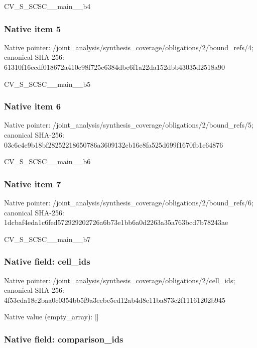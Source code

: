 \documentclass[10pt,a4paper]{article}
\begin{document}
CV\_S\_SCSC\_\_main\_\_b4


\subsubsection{Native item 5}


Native pointer: /joint\_analysis/synthesi\allowbreak{}s\_coverage/obligations/2\allowbreak{}/bound\_refs/4; canonical SHA-256: 61310f16ecdf018672a410e9\allowbreak{}8f725c6384dbe6f1a22da152\allowbreak{}dbb43035d2518a90


CV\_S\_SCSC\_\_main\_\_b5


\subsubsection{Native item 6}


Native pointer: /joint\_analysis/synthesi\allowbreak{}s\_coverage/obligations/2\allowbreak{}/bound\_refs/5; canonical SHA-256: 03c6c4e9b18bf28252218650\allowbreak{}786a3609132cb16e8fa525d6\allowbreak{}99f1670fb1e64876


CV\_S\_SCSC\_\_main\_\_b6


\subsubsection{Native item 7}


Native pointer: /joint\_analysis/synthesi\allowbreak{}s\_coverage/obligations/2\allowbreak{}/bound\_refs/6; canonical SHA-256: 1dcbaf4eda1c6fed57292920\allowbreak{}2726a6b73e1bb6a0d2263a35\allowbreak{}a763bcd7b78243ae


CV\_S\_SCSC\_\_main\_\_b7


\subsubsection{Native field: cell\_ids}


Native pointer: /joint\_analysis/synthesi\allowbreak{}s\_coverage/obligations/2\allowbreak{}/cell\_ids; canonical SHA-256: 4f53cda18c2baa0c0354bb5f\allowbreak{}9a3ecbe5ed12ab4d8e11ba87\allowbreak{}3c2f11161202b945



Native value (empty\_array): []



\subsubsection{Native field: comparison\_ids}
\end{document}
